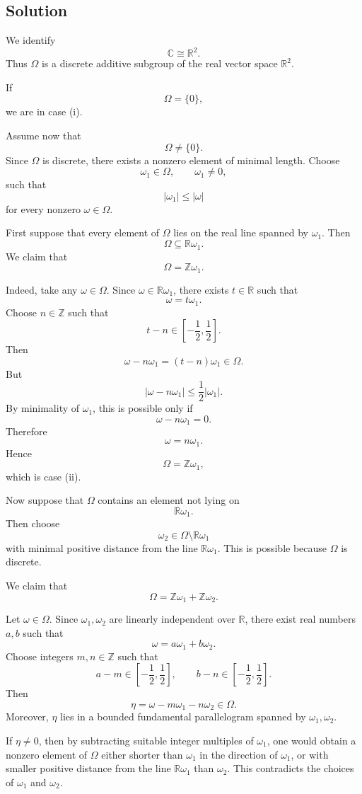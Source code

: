 \documentclass[12pt,a4paper]{article}
\theoremstyle{notespace}
\begin{document}
\subsection*{Solution}

We identify
\[
\mathbb C\cong \mathbb R^2.
\]
Thus \(\Omega\) is a discrete additive subgroup of the real vector space
\(\mathbb R^2\).

If
\[
\Omega=\{0\},
\]
we are in case (i).

Assume now that
\[
\Omega\neq\{0\}.
\]
Since \(\Omega\) is discrete, there exists a nonzero element of minimal length.
Choose
\[
\omega_1\in\Omega,\qquad \omega_1\neq 0,
\]
such that
\[
|\omega_1|\leq |\omega|
\]
for every nonzero \(\omega\in\Omega\).

First suppose that every element of \(\Omega\) lies on the real line spanned
by \(\omega_1\). Then
\[
\Omega\subseteq \mathbb R\omega_1.
\]
We claim that
\[
\Omega=\mathbb Z\omega_1.
\]

Indeed, take any \(\omega\in\Omega\). Since \(\omega\in\mathbb R\omega_1\),
there exists \(t\in\mathbb R\) such that
\[
\omega=t\omega_1.
\]
Choose \(n\in\mathbb Z\) such that
\[
t-n\in\left[-\frac12,\frac12\right].
\]
Then
\[
\omega-n\omega_1=(t-n)\omega_1\in\Omega.
\]
But
\[
|\omega-n\omega_1|\leq \frac12|\omega_1|.
\]
By minimality of \(\omega_1\), this is possible only if
\[
\omega-n\omega_1=0.
\]
Therefore
\[
\omega=n\omega_1.
\]
Hence
\[
\Omega=\mathbb Z\omega_1,
\]
which is case (ii).

Now suppose that \(\Omega\) contains an element not lying on
\[
\mathbb R\omega_1.
\]
Then choose
\[
\omega_2\in\Omega\setminus\mathbb R\omega_1
\]
with minimal positive distance from the line \(\mathbb R\omega_1\).
This is possible because \(\Omega\) is discrete.

We claim that
\[
\Omega=\mathbb Z\omega_1+\mathbb Z\omega_2.
\]

Let \(\omega\in\Omega\). Since \(\omega_1,\omega_2\) are linearly independent
over \(\mathbb R\), there exist real numbers \(a,b\) such that
\[
\omega=a\omega_1+b\omega_2.
\]
Choose integers \(m,n\in\mathbb Z\) such that
\[
a-m\in\left[-\frac12,\frac12\right],
\qquad
b-n\in\left[-\frac12,\frac12\right].
\]
Then
\[
\eta=\omega-m\omega_1-n\omega_2\in\Omega.
\]
Moreover, \(\eta\) lies in a bounded fundamental parallelogram spanned by
\(\omega_1,\omega_2\).

If \(\eta\neq 0\), then by subtracting suitable integer multiples of
\(\omega_1\), one would obtain a nonzero element of \(\Omega\) either shorter
than \(\omega_1\) in the direction of \(\omega_1\), or with smaller positive
distance from the line \(\mathbb R\omega_1\) than \(\omega_2\). This contradicts
the choices of \(\omega_1\) and \(\omega_2\).
\end{document}
